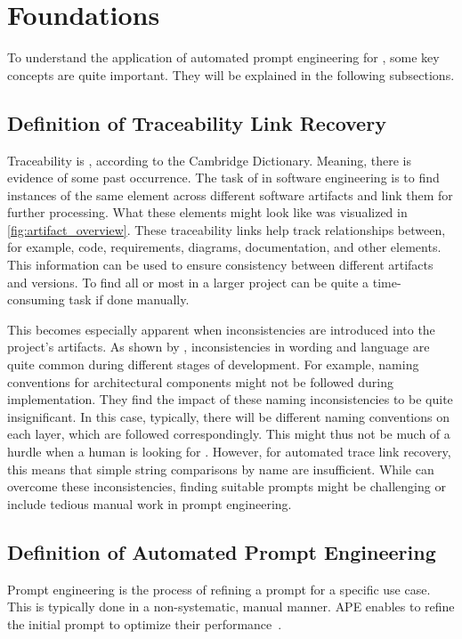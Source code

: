 \chapter{Foundations}

To understand the application of automated prompt engineering for \TLR, some key concepts are quite important.
They will be explained in the following subsections.


\section{Definition of Traceability Link Recovery}
Traceability is , according to the Cambridge Dictionary.
Meaning, there is evidence of some past occurrence.
The task of \TLR in software engineering is to find instances of the same element across different software artifacts and link them for further processing.
What these elements might look like was visualized in \autoref{fig:artifact_overview}.
These traceability links help track relationships between, for example, code, requirements, diagrams, documentation, and other elements.
This information can be used to ensure consistency between different artifacts and versions.
To find all or most \TLs in a larger project can be quite a time-consuming task if done manually.

This becomes especially apparent when inconsistencies are introduced into the project's artifacts.
As shown by , inconsistencies in wording and language are quite common during different stages of development.
For example, naming conventions for architectural components might not be followed during implementation.
They find the impact of these naming inconsistencies to be quite insignificant.
In this case, typically, there will be different naming conventions on each layer, which are followed correspondingly.
This might thus not be much of a hurdle when a human is looking for \TLs.
However, for automated trace link recovery, this means that simple string comparisons by name are insufficient.
While \LLMs can overcome these inconsistencies, finding suitable prompts might be challenging or include tedious manual work in prompt engineering. 


\section{Definition of Automated Prompt Engineering}
\label{foundations:sec:automated_prompt_engineering}
Prompt engineering is the process of refining a prompt for a specific use case.
This is typically done in a non-systematic, manual manner. \Acl{APE} enables \LLMs to refine the initial prompt to optimize their performance~\cite{zadenoori2025AutomaticPrompt}.

